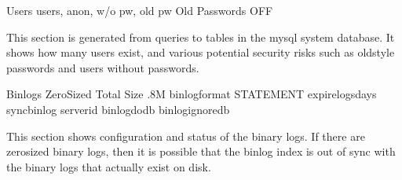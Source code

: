 \documentclass[letterpaper,10pt,english]{sphinxmanual}
\begin{document}
\begin{sphinxVerbatim}[commandchars=\\\{\}]
                    Users   users,  anon,  w/o pw,  old pw
            Old Passwords  OFF
\end{sphinxVerbatim}

This section is generated from queries to tables in the mysql system database.
It shows how many users exist, and various potential security risks such as
old\sphinxhyphen{}style passwords and users without passwords.

\begin{sphinxVerbatim}[commandchars=\\\{\}]
                  Binlogs  
               Zero\PYGZhy{}Sized  
               Total Size  .8M
            binlog\PYGZus{}format  STATEMENT
         expire\PYGZus{}logs\PYGZus{}days  
              sync\PYGZus{}binlog  
                server\PYGZus{}id  
             binlog\PYGZus{}do\PYGZus{}db 
         binlog\PYGZus{}ignore\PYGZus{}db 
\end{sphinxVerbatim}

This section shows configuration and status of the binary logs. If there are
zero\sphinxhyphen{}sized binary logs, then it is possible that the binlog index is out of sync
with the binary logs that actually exist on disk.
\end{document}
